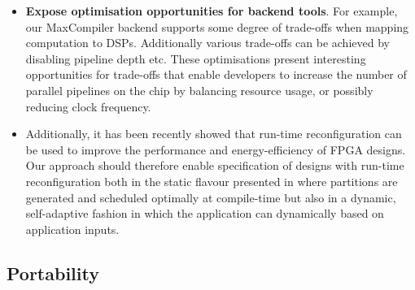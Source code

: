 \begin{itemize}
\item \textbf{Expose optimisation opportunities for backend
  tools}. For example, our MaxCompiler backend supports some degree of
  trade-offs when mapping computation to DSPs. Additionally various
  trade-offs can be achieved by disabling pipeline depth etc.  These
  optimisations present interesting opportunities for trade-offs that
  enable developers to increase the number of parallel pipelines on
  the chip by balancing resource usage, or possibly reducing clock
  frequency.

\item Additionally, it has been recently showed that run-time
  reconfiguration can be used to improve the performance and
  energy-efficiency of FPGA designs.  Our
  approach should therefore enable specification of designs with
  run-time reconfiguration both in the static flavour presented in
  \cite{Xinyu:Qiwei:Luk:Qiang:Pell:2012} where partitions are
  generated and scheduled optimally at compile-time but also in a
  dynamic, self-adaptive fashion \cite{6322875} in which the
  application can dynamically based on application inputs.

\end{itemize}




\subsection{Portability}

